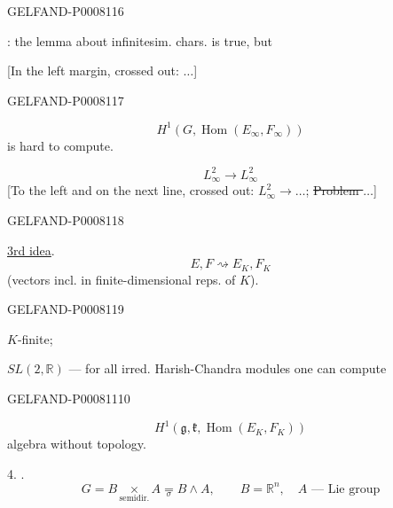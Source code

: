 \begin{GelfandAdjacentEvidence}{GELFAND-P000811}{6}


: the lemma about infinitesim. chars. is true, but

[In the left margin, crossed out: \(\ldots\)]
\end{GelfandAdjacentEvidence}
\begin{GelfandAdjacentEvidence}{GELFAND-P000811}{7}

\[
H^1(G,\operatorname{Hom}(E_\infty,F_\infty))
\]
is hard to compute.

\[
L_\infty^2\longrightarrow L_\infty^2
\]
[To the left and on the next line, crossed out: \sout{\(L_\infty^2\longrightarrow\ldots\)};\quad
\sout{Problem \(\ldots\)}]
\end{GelfandAdjacentEvidence}
\begin{GelfandAdjacentEvidence}{GELFAND-P000811}{8}


\uline{3rd idea}.
\[
E,F\rightsquigarrow E_K,F_K
\]
(vectors incl. in finite-dimensional reps. of \(K\)).

\end{GelfandAdjacentEvidence}
\begin{GelfandAdjacentEvidence}{GELFAND-P000811}{9}


\(K\)-finite;\qquad {}

\(SL(2,\mathbb R)\) — for all irred. Harish-Chandra modules one can compute
\end{GelfandAdjacentEvidence}
\begin{GelfandAdjacentEvidence}{GELFAND-P000811}{10}

\[
H^1(\mathfrak g,\mathfrak k,\operatorname{Hom}(E_K,F_K))
\]
algebra without topology.

4. .
\[
G=B\underset{\text{semidir.}}{\times}A\underset{\sigma}{=}B\wedge A,
\qquad B=\mathbb R^n,\quad A\text{ — Lie group}
\]
\end{GelfandAdjacentEvidence}


